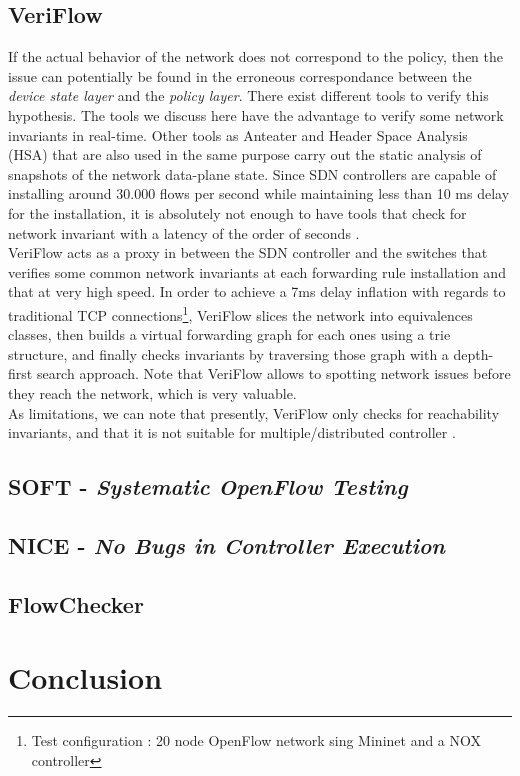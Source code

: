 \documentclass[10pt,article]{IEEEtran}
\begin{document}
\subsection{VeriFlow}
If the actual behavior of the network does not correspond to the policy, then the issue can potentially be found in the erroneous correspondance between the \textit{device state layer} and the \textit{policy layer}. There exist different tools to verify this hypothesis. The tools we discuss here have the advantage to verify some network invariants in real-time. Other tools as Anteater and Header Space Analysis (HSA) that are also used in the same purpose carry out the static analysis of snapshots of the network data-plane state\cite{Kazemian:2012:HSA:2228298.2228311}\cite{Mai:2011:DDP:2018436.2018470}. Since SDN controllers are capable of installing around 30.000 flows per second while maintaining less than 10 ms delay for the installation, it is absolutely not enough to have tools that check for network invariant with a latency of the order of seconds \cite{Khurshid:2013:VVN:2482626.2482630}.\\
VeriFlow acts as a proxy in between the SDN controller and the switches that verifies some common network invariants at each forwarding rule installation and that at very high speed. In order to achieve a 7ms delay inflation with regards to traditional TCP connections\footnote{Test configuration : 20 node OpenFlow network sing Mininet and a NOX controller\cite{Khurshid:2013:VVN:2482626.2482630} }, VeriFlow slices the network into equivalences classes, then builds a virtual forwarding graph for each ones using a trie structure, and finally checks invariants by traversing those graph with a depth-first search approach. Note that VeriFlow allows to spotting network issues before they reach the network, which is very valuable.\\
As limitations, we can note that presently, VeriFlow only checks for reachability invariants, and that it is not suitable for multiple/distributed controller \cite{Khurshid:2013:VVN:2482626.2482630}.

\subsection{SOFT - \textit{Systematic OpenFlow Testing}}

\subsection{NICE - \textit{No Bugs in Controller Execution}}

\subsection{FlowChecker}




\section{Conclusion}




\end{document}
